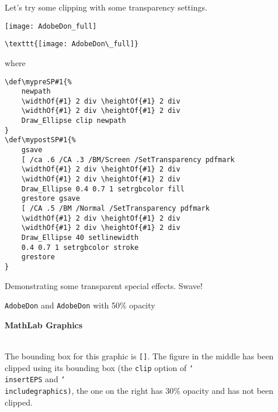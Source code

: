 \documentclass{article}
\newcommand{\cs}[1]{\texttt{\char`\\#1}}
\begin{document}
\medskip
Let's try some clipping with some transparency settings.

\medskip
\begin{minipage}{1.6in}
\begin{center}
\texttt{[image: AdobeDon\_full]}
\end{center}
\end{minipage}\hfill
\begin{minipage}{\linewidth-1.6in}\scriptsize
\begin{verbatim}
\texttt{[image: AdobeDon\_full]}
\end{verbatim}
{\normalsize where}
\begin{verbatim}
\def\mypreSP#1{%
    newpath
    \widthOf{#1} 2 div \heightOf{#1} 2 div
    \widthOf{#1} 2 div \heightOf{#1} 2 div
    Draw_Ellipse clip newpath
}
\def\mypostSP#1{%
    gsave
    [ /ca .6 /CA .3 /BM/Screen /SetTransparency pdfmark
    \widthOf{#1} 2 div \heightOf{#1} 2 div
    \widthOf{#1} 2 div \heightOf{#1} 2 div
    Draw_Ellipse 0.4 0.7 1 setrgbcolor fill
    grestore gsave
    [ /CA .5 /BM /Normal /SetTransparency pdfmark
    \widthOf{#1} 2 div \heightOf{#1} 2 div
    \widthOf{#1} 2 div \heightOf{#1} 2 div
    Draw_Ellipse 40 setlinewidth
    0.4 0.7 1 setrgbcolor stroke
    grestore
}
\end{verbatim}
\end{minipage}
Demonstrating some transparent special effects. Swave!

\begin{center}
\texttt{AdobeDon} and \texttt{AdobeDon} with 50\% opacity\\[1ex]
 
\end{center}


\begin{center}\previewtrue
\textsf{\textbf{MathLab Graphics}}\\[1ex]
   \\
\end{center}
The bounding box for this graphic is
\texttt{[\space{}\space{}\space{}]}.
The figure in the middle has been clipped using its bounding box (the \texttt{clip} option
of \cs{insertEPS} and \cs{includegraphics)}, the
one on the right has 30\% opacity and has not been clipped.
\end{document}
